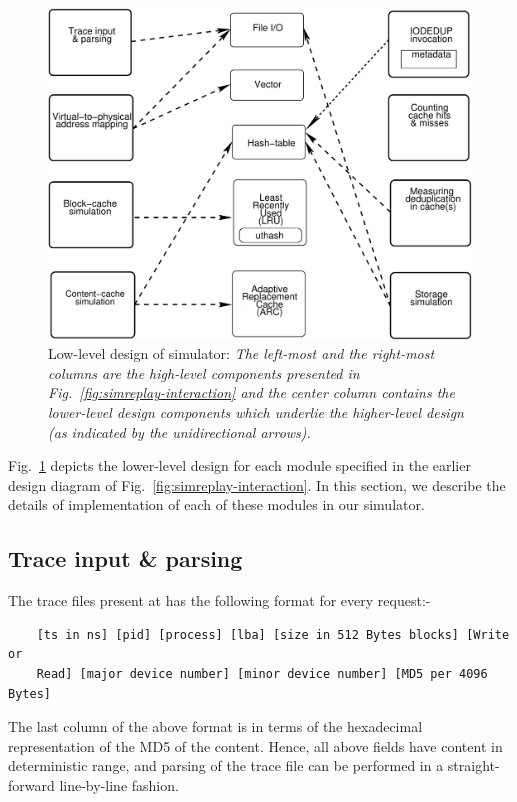 
\begin{figure}[t]
    \centering
    \includegraphics[scale=0.6]{simreplaychap-figures/simreplay-lowlevel.pdf}
    \caption{Low-level design of simulator: \textit{The left-most and the 
		right-most columns are the high-level components presented in 
		Fig.~\ref{fig:simreplay-interaction} and the center column contains
		the lower-level design components which underlie the
		higher-level design (as indicated by the unidirectional arrows).}}
    \label{fig:simreplay-lowlevel}
\end{figure}

Fig.~\ref{fig:simreplay-lowlevel} depicts the lower-level design for
each module specified in the earlier design diagram of 
Fig.~\ref{fig:simreplay-interaction}. In this section, we describe the
details of implementation of each of these modules in our simulator.

\subsection{Trace input \& parsing} 
\label{sec:simreplay-parsing}
The trace files present at \cite{iodedup-online} has the following
format for every request:-
\begin{verbatim}
    [ts in ns] [pid] [process] [lba] [size in 512 Bytes blocks] [Write or 
	Read] [major device number] [minor device number] [MD5 per 4096 Bytes]
\end{verbatim}
The last column of the above format is in terms of the hexadecimal 
representation of the MD5 of the content. Hence, all above fields have
content in deterministic range, and parsing of the trace file can
be performed in a straight-forward line-by-line fashion. 

